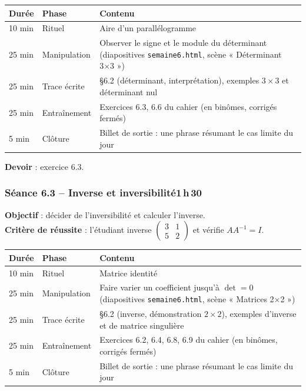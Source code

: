 \documentclass[10.5pt,a4paper]{article}
\newif\ifprof
\newcommand{\profonly}[1]{\ifprof #1\fi}
\begin{document}
\begin{longtable}{@{}p{1.1cm}p{2.4cm}p{12.4cm}@{}}
\toprule \textbf{Durée} & \textbf{Phase} & \textbf{Contenu}\\ \midrule\endhead
10 min & Rituel & Aire d'un parallélogramme\\
25 min & Manipulation & Observer le signe et le module du déterminant (diapositives \texttt{semaine6.html}, scène « Déterminant 3×3 »)\\
25 min & Trace écrite & \S6.2 (déterminant, interprétation), exemples $3\times3$ et déterminant nul\\
25 min & Entraînement & Exercices 6.3, 6.6 du cahier (en binômes, corrigés fermés)\\
5 min & Clôture & Billet de sortie : une phrase résumant le cas limite du jour\\ \bottomrule\end{longtable}\nopagebreak
\textbf{Devoir} : exercice 6.3.\profonly{ \textbf{Point de vigilance} : Damier des signes rappelé avant le premier développement.}\par
{}\subsubsection*{\textcolor{marine}{Séance 6.3 -- Inverse et inversibilité}\hfill\normalfont\small\textcolor{ardoise}{1\,h\,30}}
\begin{objectif}\textbf{Objectif} : décider de l'inversibilité et calculer l'inverse.\\\textbf{Critère de réussite} : l'étudiant inverse $\begin{pmatrix}3&1\\5&2\end{pmatrix}$ et vérifie $AA^{-1}=I$.\end{objectif}\nopagebreak
\begin{longtable}{@{}p{1.1cm}p{2.4cm}p{12.4cm}@{}}
\toprule \textbf{Durée} & \textbf{Phase} & \textbf{Contenu}\\ \midrule\endhead
10 min & Rituel & Matrice identité\\
25 min & Manipulation & Faire varier un coefficient jusqu'à $\det=0$ (diapositives \texttt{semaine6.html}, scène « Matrices 2×2 »)\\
25 min & Trace écrite & \S6.2 (inverse, démonstration $2\times2$), exemples d'inverse et de matrice singulière\\
25 min & Entraînement & Exercices 6.2, 6.4, 6.8, 6.9 du cahier (en binômes, corrigés fermés)\\
5 min & Clôture & Billet de sortie : une phrase résumant le cas limite du jour\\ \bottomrule\end{longtable}\nopagebreak
\end{document}
